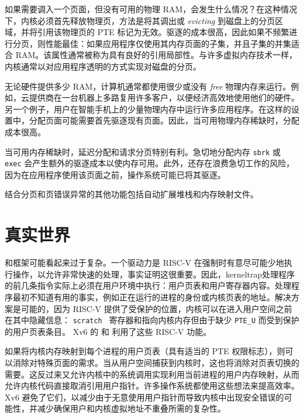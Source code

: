 如果需要调入一个页面，但没有可用的物理 RAM，会发生什么情况？在这种情况下，内核必须首先释放物理页，方法是将其调出或  {    \it    evicting   }  到磁盘上的分页区域，并将引用该物理页的 PTE 标记为无效。驱逐的成本很高，因此如果不频繁进行分页，则性能最佳：如果应用程序仅使用其内存页面的子集，并且子集的并集适合 RAM。该属性通常被称为具有良好的引用局部性。与许多虚拟内存技术一样，内核通常以对应用程序透明的方式实现对磁盘的分页。  

无论硬件提供多少 RAM，计算机通常都使用很少或没有  {    \it    free   }  物理内存来运行。例如，云提供商在一台机器上多路复用许多客户，以便经济高效地使用他们的硬件。另一个例子，用户在智能手机上的少量物理内存中运行许多应用程序。在这样的设置中，分配页面可能需要首先驱逐现有页面。因此，当可用物理内存稀缺时，分配成本很高。  

当可用内存稀缺时，延迟分配和请求分页特别有利。急切地分配内存
    \lstinline{sbrk}    或    \lstinline{exec}    会产生额外的驱逐成本以使内存可用。此外，还存在浪费急切工作的风险，因为在应用程序使用该页面之前，操作系统可能已将其驱逐。  

结合分页和页错误异常的其他功能包括自动扩展堆栈和内存映射文件。  

   \section{真实世界  }     

和框架可能看起来过于复杂。一个驱动力是 RISC-V 在强制时有意尽可能少地执行操作，以允许非常快速的处理，事实证明这很重要。因此，kerneltrap处理程序的前几条指令实际上必须在用户环境中执行：用户页表和用户寄存器内容。处理程序最初不知道有用的事实，例如正在运行的进程的身份或内核页表的地址。解决方案是可能的，因为 RISC-V 提供了受保护的位置，内核可以在进入用户空间之前在其中隐藏信息：  {    \tt    scratch   }  寄存器和指向内核内存但由于缺少    \lstinline{PTE_U}    而受到保护的用户页表条目。 Xv6 的  和  利用了这些 RISC-V 功能。  

如果将内核内存映射到每个进程的用户页表（具有适当的 PTE 权限标志），则可以消除对特殊页面的需求。当从用户空间捕获到内核时，这也将消除对页表切换的需要。这反过来又允许内核中的系统调用实现利用当前进程的用户内存映射，从而允许内核代码直接取消引用用户指针。许多操作系统都使用这些想法来提高效率。 Xv6 避免了它们，以减少由于无意使用用户指针而导致内核中出现安全错误的可能性，并减少确保用户和内核虚拟地址不重叠所需的复杂性。  

